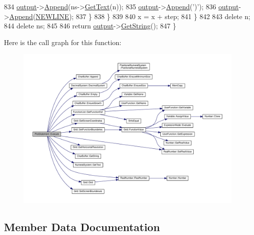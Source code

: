 \begin{DoxyCode}
834                 \hyperlink{classSyntaxNode_a1180628cbe3fce43930cee0df5a9ce5c}{output}->\hyperlink{classCharBuffer_a045b38735f7b3007c1b98d3d7b7feafe}{Append}(ns->\hyperlink{classNumeralSystem_a74dc91c4dbab4a88a123b2a32753f485}{GetText}(n));
835                 \hyperlink{classSyntaxNode_a1180628cbe3fce43930cee0df5a9ce5c}{output}->\hyperlink{classCharBuffer_a045b38735f7b3007c1b98d3d7b7feafe}{Append}(\textcolor{charliteral}{')'});
836                 \hyperlink{classSyntaxNode_a1180628cbe3fce43930cee0df5a9ce5c}{output}->\hyperlink{classCharBuffer_a045b38735f7b3007c1b98d3d7b7feafe}{Append}(\hyperlink{platform_8h_a806511f4930171733227c99101dc0606}{NEWLINE});
837             \}
838         \}
839 
840         x = x + step;
841     \}
842 
843     \textcolor{keyword}{delete} n;
844     \textcolor{keyword}{delete} ns;
845 
846     \textcolor{keywordflow}{return} \hyperlink{classSyntaxNode_a1180628cbe3fce43930cee0df5a9ce5c}{output}->\hyperlink{classCharBuffer_a7dfd3feaaf80f318ba44efe15b1ec44b}{GetString}();
847 \}
\end{DoxyCode}


Here is the call graph for this function\+:
\nopagebreak
\begin{figure}[H]
\begin{center}
\leavevmode
\includegraphics[width=350pt]{d6/d40/classPlotStatement_a653ff64c2c918b3209be426f7c243459_cgraph}
\end{center}
\end{figure}




\subsection{Member Data Documentation}
